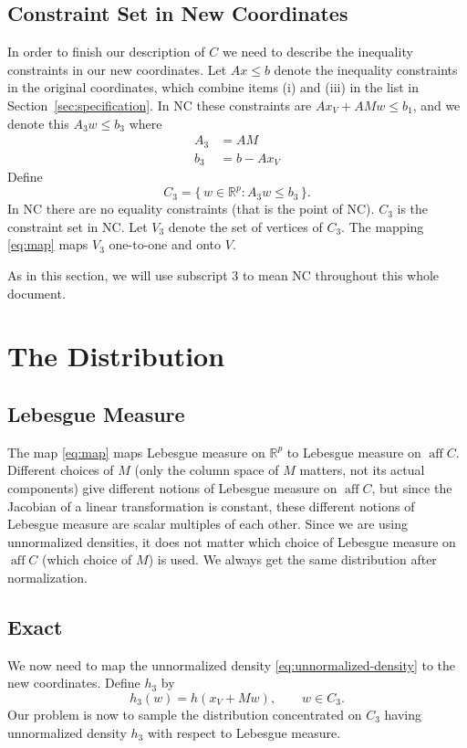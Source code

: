 \documentclass[11pt]{article}
\DeclareMathOperator{\aff}{aff}
\newcommand{\real}{\mathbb{R}}
\newcommand{\set}[1]{\{\, #1 \,\}}
\begin{document}
\subsection{Constraint Set in New Coordinates}

In order to finish our description of $C$ we need to describe the inequality
constraints in our new coordinates.  Let $A x \le b$ denote the inequality
constraints in the original coordinates, which combine items (i) and (iii)
in the list in Section~\ref{sec:specification}.
In NC these constraints are $A x_V + A M w \le b_1$,
and we denote this $A_3 w \le b_3$ where
\begin{align*}
   A_3 & = A M
   \\
   b_3 & = b - A x_V
\end{align*}
Define
$$
   C_3 = \set{ w \in \real^p : A_3 w \le b_3 }.
$$
In NC there are no equality constraints (that is the point of NC).
$C_3$ is the constraint set in NC.
Let $V_3$ denote the set of vertices of $C_3$.
The mapping \eqref{eq:map} maps $V_3$ one-to-one and onto $V$.

As in this section, we will use subscript 3 to mean NC throughout
this whole document.

\section{The Distribution}

\subsection{Lebesgue Measure}

The map \eqref{eq:map} maps Lebesgue measure on $\real^p$ to Lebesgue measure
on $\aff C$.  Different choices of $M$ (only the column space of $M$ matters,
not its actual components) give different notions of Lebesgue measure on
$\aff C$, but since the Jacobian of a linear transformation is constant,
these different notions of Lebesgue measure are scalar multiples of each other.
Since we are using unnormalized densities, it does not matter which choice
of Lebesgue measure on $\aff C$ (which choice of $M$) is used.
We always get the same distribution after normalization.

\subsection{Exact}

We now need to map the unnormalized density \eqref{eq:unnormalized-density}
to the new coordinates.  Define $h_3$ by
\begin{equation} \label{eq:h-new}
   h_3(w) = h(x_V + M w), \qquad w \in C_3.
\end{equation}
Our problem is now to sample the distribution concentrated on $C_3$
having unnormalized density $h_3$ with respect to Lebesgue measure.
\end{document}
